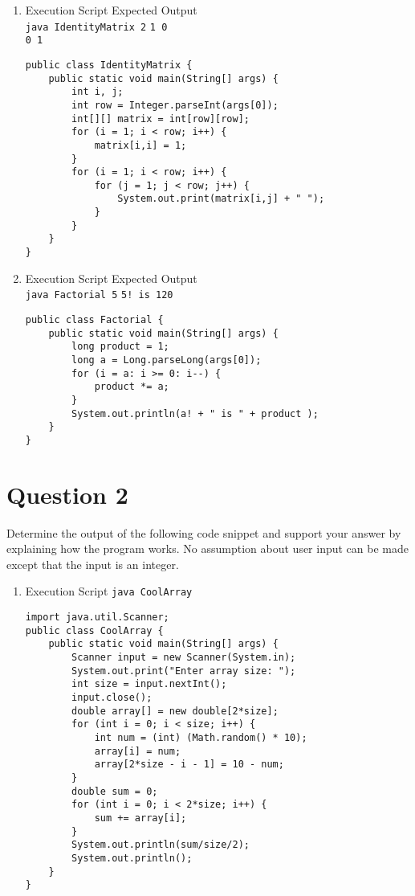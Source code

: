 \documentclass[12pt,letterpaper,twoside]{article}
\begin{document}
\begin{enumerate}[label=\textbf{(\alph*)}]
\item Execution Script \hfill Expected Output\\
\texttt{java IdentityMatrix 2} \hfill \texttt{1 0}\\ \raggedleft \texttt{0 1}

\begin{lstlisting}
public class IdentityMatrix {
	public static void main(String[] args) {
		int i, j;
		int row = Integer.parseInt(args[0]);
		int[][] matrix = int[row][row];
		for (i = 1; i < row; i++) {
			matrix[i,i] = 1;
		}
		for (i = 1; i < row; i++) {
			for (j = 1; j < row; j++) {
				System.out.print(matrix[i,j] + " ");
			}
		}
	}
}
\end{lstlisting}
\newpage
\item Execution Script \hfill Expected Output\\
\texttt{java Factorial 5} \hfill \texttt{5! is 120}

\begin{lstlisting}
public class Factorial {
	public static void main(String[] args) {
		long product = 1;
		long a = Long.parseLong(args[0]);
		for (i = a: i >= 0: i--) {
			product *= a;
		}
		System.out.println(a! + " is " + product );
	}
}
\end{lstlisting}

\end{enumerate}

\section*{Question 2}

Determine the output of the following code snippet and support your answer by explaining how the program works. No assumption about user input can be made except that the input is an integer.

\begin{enumerate}[label=\textbf{(\alph*)}]
\item Execution Script \hfill \texttt{java CoolArray}

\begin{lstlisting}
import java.util.Scanner;
public class CoolArray {
	public static void main(String[] args) {
		Scanner input = new Scanner(System.in);
		System.out.print("Enter array size: ");
		int size = input.nextInt();
		input.close();
		double array[] = new double[2*size];
		for (int i = 0; i < size; i++) {
			int num = (int) (Math.random() * 10);
			array[i] = num;
			array[2*size - i - 1] = 10 - num;
		}
		double sum = 0;
		for (int i = 0; i < 2*size; i++) {
			sum += array[i];
		}
		System.out.println(sum/size/2);
		System.out.println();
	}
}

\end{lstlisting}

\end{enumerate}
\end{document}
